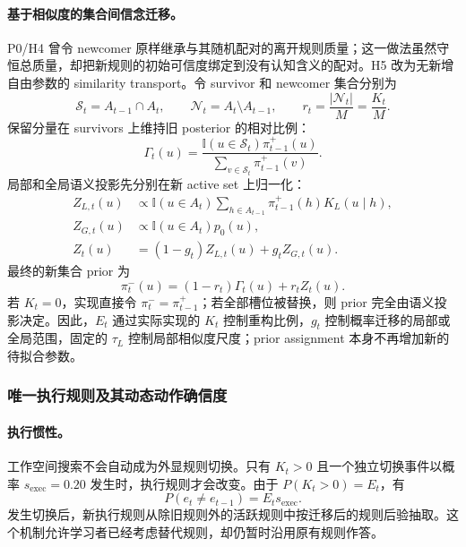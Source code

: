 \paragraph{基于相似度的集合间信念迁移。}
P0/H4 曾令 newcomer 原样继承与其随机配对的离开规则质量；这一做法虽然守恒总质量，却把新规则的初始可信度绑定到没有认知含义的配对。H5 改为无新增自由参数的 similarity transport。令 survivor 和 newcomer 集合分别为
\begin{equation}
\mathcal S_t=A_{t-1}\cap A_t,
\qquad
\mathcal N_t=A_t\setminus A_{t-1},
\qquad
r_t=\frac{|\mathcal N_t|}{M}=\frac{K_t}{M}.
\label{eq:m0815-transport-fraction}
\end{equation}
保留分量在 survivors 上维持旧 posterior 的相对比例：
\begin{equation}
\Gamma_t(u)
=
\frac{\mathbb I(u\in\mathcal S_t)\pi_{t-1}^{+}(u)}
{\sum_{v\in\mathcal S_t}\pi_{t-1}^{+}(v)}.
\label{eq:m0815-survivor-carryover}
\end{equation}
局部和全局语义投影先分别在新 active set 上归一化：
\begin{align}
Z_{L,t}(u)
&\propto
\mathbb I(u\in A_t)
\sum_{h\in A_{t-1}}\pi_{t-1}^{+}(h)K_L(u\mid h),
\nonumber\\
Z_{G,t}(u)
&\propto
\mathbb I(u\in A_t)p_0(u),
\nonumber\\
Z_t(u)
&=(1-g_t)Z_{L,t}(u)+g_tZ_{G,t}(u).
\label{eq:m0815-semantic-projection}
\end{align}
最终的新集合 prior 为
\begin{equation}
\boxed{
\pi_t^{-}(u)
=(1-r_t)\Gamma_t(u)+r_tZ_t(u)
}.
\label{eq:m0815-similarity-transport}
\end{equation}
若 $K_t=0$，实现直接令 $\pi_t^{-}=\pi_{t-1}^{+}$；若全部槽位被替换，则 prior 完全由语义投影决定。因此，$E_t$ 通过实际实现的 $K_t$ 控制重构比例，$g_t$ 控制概率迁移的局部或全局范围，固定的 $\tau_L$ 控制局部相似度尺度；prior assignment 本身不再增加新的待拟合参数。


\subsubsection{唯一执行规则及其动态动作确信度}

\paragraph{执行惯性。}
工作空间搜索不会自动成为外显规则切换。只有 $K_t>0$ 且一个独立切换事件以概率
$s_{\mathrm{exec}}=0.20$ 发生时，执行规则才会改变。由于
$P(K_t>0)=E_t$，有
\begin{equation}
P(e_t\neq e_{t-1})=E_ts_{\mathrm{exec}}.
\label{eq:m0815-execution-hazard}
\end{equation}
发生切换后，新执行规则从除旧规则外的活跃规则中按迁移后的规则后验抽取。这个机制允许学习者已经考虑替代规则，却仍暂时沿用原有规则作答。

